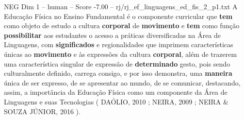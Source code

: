 \begin{textsample}{NEG Dim 1 – human – Score -7.00 – rj/rj\_ef\_linguagens\_ed\_fis\_2\_p1.txt}  \label{ex:f1_neg_005}
A Educação Física no Ensino Fundamental é o componente curricular que \textbf{tem} como objeto de estudo a cultura \textbf{corporal} de \textbf{movimento} e \textbf{tem} como função \textbf{possibilitar} aos estudantes o acesso a práticas diversificadas na Área de Linguagens, com \textbf{significados} e regionalidades que imprimem características únicas ao \textbf{movimento} e às expressões da cultura \textbf{corporal}, além de trazerem uma característica singular de expressão de \textbf{determinado} gesto, pois sendo culturalmente definido, carrega consigo, e por isso demonstra, uma \textbf{maneira} única de ser expresso, de se apresentar ao mundo, de se comunicar, destacando, assim, a importância da Educação Física como um componente da Área de Linguagens e suas Tecnologias ( DAÓLIO, 2010 ; NEIRA, 2009 ; NEIRA \& SOUZA JÚNIOR, 2016 ).

\end{textsample}
